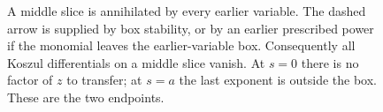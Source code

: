 \begin{figure}[htbp]
\centering
{}
\caption{A middle slice is annihilated by every earlier variable.
The dashed arrow is supplied by box stability, or by an earlier
prescribed power if the monomial leaves the earlier-variable box.
Consequently all Koszul differentials on a middle slice vanish.
At $s=0$ there is no factor of $z$ to transfer; at $s=a$ the
last exponent is outside the box. These are the two endpoints.}
\label{fig:endpoint-slices}
\end{figure}
